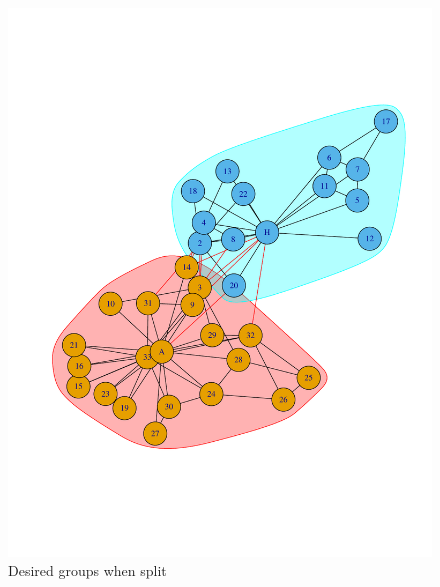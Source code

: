 \documentclass[letterpaper,11pt]{article}
\begin{document}
\begin{figure}[h]
\centering
\includegraphics[scale=0.6]{actualSplitDesired.pdf}
\caption{Desired groups when split}
\label{fig:q1desired}
\end{figure}


\end{document}
